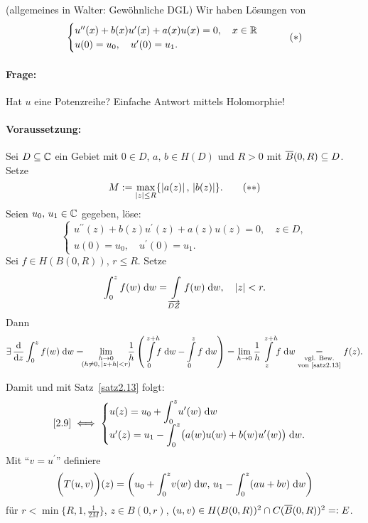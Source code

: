 \documentclass[a4paper,twoside,DIV15,BCOR12mm]{scrbook}
\begin{document}
\begin{bsp} (allgemeines in Walter: Gewöhnliche DGL) Wir haben Lösungen von
\[\label{2.43s}\begin{cases}u^{\prime\prime}(x)+b(x)u^\prime(x)+a(x)u(x)=0,\quad x\in\mathbb{R}\\u(0)=u_0,\quad u^\prime(0)=u_1.\end{cases}\tag{$*$}\]
\paragraph{Frage:} Hat $u$ eine Potenzreihe? Einfache Antwort mittels Holomorphie!
\vspace*{-12pt}\paragraph{Voraussetzung:} Sei $D\subseteq\mathbb{C}$ ein Gebiet mit $0\in D$, $a,\,b\in H(D)$ und $R>0$ mit $\overline{B}(0,R)\subseteq D$. Setze
\[\label{2.43ss}M:=\max_{\left\lvert z\right\lvert\leq R}\{\left\lvert a(z)\right\lvert,\,\left\lvert b(z)\right\lvert\}.\tag{$**$}\]
Seien $u_0,\,u_1\in\mathbb{C}$ gegeben, löse:
\begin{equation}\label{2.9}\begin{cases}
u^{\prime\prime}(z)+b(z)u^\prime(z)+a(z)u(z)=0,\quad z\in D,\\
u(0)=u_0,\quad u^\prime(0)=u_1.
\end{cases}\end{equation}
Sei $f\in H(B(0,R))$, $r\leq R$. Setze
\[\int_{0}^{z}{f(w)}\;\mathrm{d} w=\int\limits_{\overrightarrow{DZ}}^{}{f(w)}\;\mathrm{d}w,\quad\left\lvert z\right\lvert<r.\]
Dann
\[\exists\,\frac{\d}{\d z}\integral{0}{z}{f(w)}{w}=\!\!\!\lim_{\substack{h\to 0\\(h\neq 0,\,\abs{z+h}<r)}}\!\!\!\frac{1}{h}\left(\Integral{0}{z+h}{\!\!f}{w}-\Integral{0}{z}{f}{w}\right)=\lim_{h\to 0}\frac{1}{h}\Integral{z}{z+h}{\!f}{w}\underset{\substack{\text{vgl. Bew.}\\\text{von \ref{satz2.13}}}}{=}f(z).\]

Damit und mit Satz~\ref{satz2.13} folgt:
\[\eqref{2.9}\iff\begin{cases}u(z)=u_0+\displaystyle\int_{0}^{z}{\!u^\prime(w)}\;\mathrm{d} w\\u^\prime(z)=u_1-\displaystyle\int_{0}^{z}{\!\bigl(a(w)u(w)+b(w)u^\prime(w)\bigr)}\;\mathrm{d} w.\end{cases}\]
Mit "`$v=u^\prime$"' definiere
\[\biggl(T(u,v)\biggr)(z)=\biggl(u_0+\int_{0}^{z}{\!v(w)}\;\mathrm{d} w,\, u_1-\int_{0}^{z}{\!(au+bv)}\;\mathrm{d} w\biggr)\]
für $r<\min\{R,1,\frac{1}{2M}\}$, $z\in B(0,r)$, $(u,v)\in H(B(0,R))^2\cap C(\overline{B}(0,R))^2=: E$.


\end{bsp}
\end{document}
